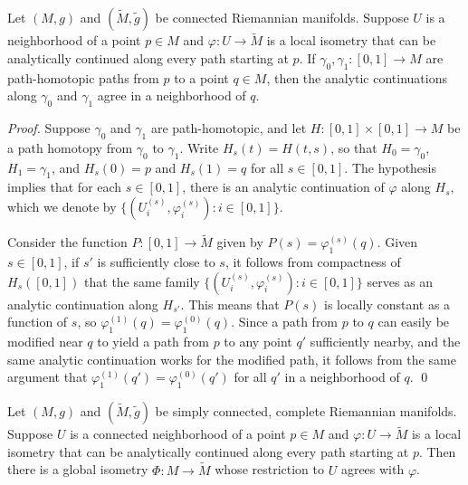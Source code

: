 \begin{theorem}
\label{thm:monodromy-theorem-local-isometries}
Let $(M, g)$ and $(\tilde{M}, \tilde{g})$ be connected Riemannian manifolds. Suppose $U$ is a neighborhood of a point $p \in M$ and $\varphi : U \to \tilde{M}$ is a local isometry that can be analytically continued along every path starting at $p$. If $\gamma_0, \gamma_1 : [0,1] \to M$ are path-homotopic paths from $p$ to a point $q \in M$, then the analytic continuations along $\gamma_0$ and $\gamma_1$ agree in a neighborhood of $q$.
\end{theorem}

\emph{Proof.} Suppose $\gamma_0$ and $\gamma_1$ are path-homotopic, and let $H : [0,1] \times [0,1] \to M$ be a path homotopy from $\gamma_0$ to $\gamma_1$. Write $H_s(t) = H(t,s)$, so that $H_0 = \gamma_0$, $H_1 = \gamma_1$, and $H_s(0) = p$ and $H_s(1) = q$ for all $s \in [0,1]$. The hypothesis implies that for each $s \in [0,1]$, there is an analytic continuation of $\varphi$ along $H_s$, which we denote by $\{(U_i^{(s)}, \varphi_i^{(s)}) : i \in [0,1]\}$.

Consider the function $P : [0,1] \to \tilde{M}$ given by $P(s) = \varphi_1^{(s)}(q)$. Given $s \in [0,1]$, if $s'$ is sufficiently close to $s$, it follows from compactness of $H_s([0,1])$ that the same family $\{(U_i^{(s)}, \varphi_i^{(s)}) : i \in [0,1]\}$ serves as an analytic continuation along $H_{s'}$. This means that $P(s)$ is locally constant as a function of $s$, so $\varphi_1^{(1)}(q) = \varphi_1^{(0)}(q)$. Since a path from $p$ to $q$ can easily be modified near $q$ to yield a path from $p$ to any point $q'$ sufficiently nearby, and the same analytic continuation works for the modified path, it follows from the same argument that $\varphi_1^{(1)}(q') = \varphi_1^{(0)}(q')$ for all $q'$ in a neighborhood of $q$. \qed

\begin{corollary}
\label{cor:global-isometry-from-local-simply-connected}
Let $(M, g)$ and $(\tilde{M}, \tilde{g})$ be simply connected, complete Riemannian manifolds. Suppose $U$ is a connected neighborhood of a point $p \in M$ and $\varphi : U \to \tilde{M}$ is a local isometry that can be analytically continued along every path starting at $p$. Then there is a global isometry $\Phi : M \to \tilde{M}$ whose restriction to $U$ agrees with $\varphi$.
\end{corollary}

